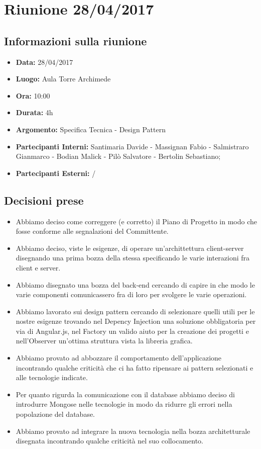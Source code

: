 \section{Riunione 28/04/2017}
  \subsection{Informazioni sulla riunione}
    \begin{itemize}
      \item \textbf{Data: }28/04/2017
      \item \textbf{Luogo: }Aula Torre Archimede
      \item \textbf{Ora: }10:00
      \item \textbf{Durata: }4h
      \item \textbf{Argomento: }Specifica Tecnica - Design Pattern
      \item \textbf{Partecipanti Interni: }Santimaria Davide - Massignan Fabio - Salmistraro Gianmarco - Bodian Malick - Pilò Salvatore - Bertolin Sebastiano;
      \item \textbf{Partecipanti Esterni: }/
    \end{itemize}
  \subsection{Decisioni prese}
		\begin{itemize}
			\item Abbiamo deciso come correggere (e corretto) il Piano di Progetto in modo che fosse conforme alle segnalazioni del Committente.
      \item Abbiamo deciso, viste le esigenze, di operare un'archittettura client-server disegnando una prima bozza della stessa specificando le varie interazioni
        fra client e server.
      \item Abbiamo disegnato una bozza del back-end cercando di capire in che modo le varie componenti comunicassero fra di loro per svolgere le varie operazioni.
      \item Abbiamo lavorato sui design pattern cercando di selezionare quelli utili per le nostre esigenze trovando nel Depency Injection una soluzione obbligatoria
        per via di Angular.js, nel Factory un valido aiuto per la creazione dei progetti e nell'Observer un'ottima struttura vista la libreria grafica.
      \item Abbiamo provato ad abbozzare il comportamento dell'applicazione incontrando qualche criticità che ci ha fatto ripensare ai pattern selezionati e alle tecnologie
        indicate.
      \item Per quanto rigurda la comunicazione con il database abbiamo deciso di introdurre Mongose nelle tecnologie in modo da ridurre gli errori nella popolazione del
        database.
      \item Abbiamo provato ad integrare la nuova tecnologia nella bozza architetturale disegnata incontrando qualche criticità nel suo collocamento.
		\end{itemize}
